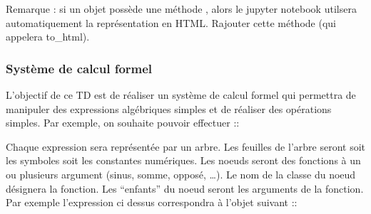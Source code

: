 \documentclass[letterpaper,10pt,english]{sphinxhowto}
\begin{document}
\sphinxAtStartPar
Remarque : si un objet possède une méthode , alors le jupyter notebook utilsera automatiquement la représentation en HTML. Rajouter cette méthode (qui appelera to\_html).


\subsubsection{Système de calcul formel}
\label{\detokenize{cours6_objet_exercices:systeme-de-calcul-formel}}
\sphinxAtStartPar
{}

\sphinxAtStartPar
L’objectif de ce TD est de réaliser un système de calcul formel qui permettra de manipuler des expressions algébriques simples et de réaliser des opérations simples. Par exemple, on souhaite pouvoir effectuer ::

\begin{sphinxVerbatim}[commandchars=\\\{\}]
  
  

    

 
\end{sphinxVerbatim}

\sphinxAtStartPar
Chaque expression sera représentée par un arbre. Les feuilles de l’arbre seront soit les symboles soit les constantes numériques. Les noeuds seront des fonctions à un ou plusieurs argument (sinus, somme, opposé, …). Le nom de la classe du noeud désignera la fonction. Les “enfants” du noeud seront les arguments de la fonction. Par exemple l’expression ci dessus correspondra à l’objet suivant ::
\end{document}
